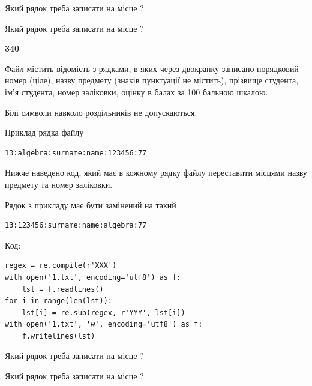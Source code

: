 Який рядок треба записати на місце  ?\par
\vspace{5mm}


Який рядок треба записати на місце  ?\par


\newpage

{\begin {center}\textbf{ 340}\end {center}}\par
Файл  містить відомість з рядками, в яких через двокрапку записано поряд\-ковий номер (ціле), назву предмету (знаків пунктуації не містить), прізвище студента, ім'я студента, номер заліковки, оцінку в балах за 100 бальною шкалою.

Білі символи навколо роздільників не допускаються.

Приклад рядка файлу



\begin{verbatim}
13:algebra:surname:name:123456:77
\end{verbatim}


Нижче наведено код, який має в кожному рядку файлу переставити місцями назву предмету та номер заліковки.

Рядок з прикладу має бути замінений на такий



\begin{verbatim}
13:123456:surname:name:algebra:77
\end{verbatim}




Код:



\begin{verbatim}
regex = re.compile(r'XXX')
with open('1.txt', encoding='utf8') as f:
    lst = f.readlines()
for i in range(len(lst)):
    lst[i] = re.sub(regex, r'YYY', lst[i])
with open('1.txt', 'w', encoding='utf8') as f:
    f.writelines(lst)
\end{verbatim}







Який рядок треба записати на місце  ?\par
\vspace{5mm}


Який рядок треба записати на місце  ?\par


